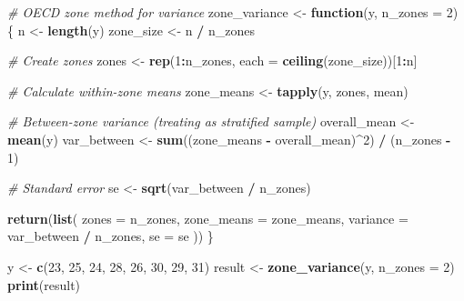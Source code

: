 \documentclass[
]{article}
\newenvironment{Shaded}{\begin{snugshade}}{\end{snugshade}}
\newcommand{\AttributeTok}[1]{\textcolor[rgb]{0.13,0.29,0.53}{#1}}
\newcommand{\CommentTok}[1]{\textcolor[rgb]{0.56,0.35,0.01}{\textit{#1}}}
\newcommand{\ControlFlowTok}[1]{\textcolor[rgb]{0.13,0.29,0.53}{\textbf{#1}}}
\newcommand{\DecValTok}[1]{\textcolor[rgb]{0.00,0.00,0.81}{#1}}
\newcommand{\FunctionTok}[1]{\textcolor[rgb]{0.13,0.29,0.53}{\textbf{#1}}}
\newcommand{\NormalTok}[1]{#1}
\newcommand{\OtherTok}[1]{\textcolor[rgb]{0.56,0.35,0.01}{#1}}
\newcommand{\SpecialCharTok}[1]{\textcolor[rgb]{0.81,0.36,0.00}{\textbf{#1}}}
\begin{document}
\begin{Shaded}
\begin{Highlighting}[]
\CommentTok{\# OECD zone method for variance}
\NormalTok{zone\_variance }\OtherTok{\textless{}{-}} \ControlFlowTok{function}\NormalTok{(y, }\AttributeTok{n\_zones =} \DecValTok{2}\NormalTok{) \{}
\NormalTok{  n }\OtherTok{\textless{}{-}} \FunctionTok{length}\NormalTok{(y)}
\NormalTok{  zone\_size }\OtherTok{\textless{}{-}}\NormalTok{ n }\SpecialCharTok{/}\NormalTok{ n\_zones}
  
  \CommentTok{\# Create zones}
\NormalTok{  zones }\OtherTok{\textless{}{-}} \FunctionTok{rep}\NormalTok{(}\DecValTok{1}\SpecialCharTok{:}\NormalTok{n\_zones, }\AttributeTok{each =} \FunctionTok{ceiling}\NormalTok{(zone\_size))[}\DecValTok{1}\SpecialCharTok{:}\NormalTok{n]}
  
  \CommentTok{\# Calculate within{-}zone means}
\NormalTok{  zone\_means }\OtherTok{\textless{}{-}} \FunctionTok{tapply}\NormalTok{(y, zones, mean)}
  
  \CommentTok{\# Between{-}zone variance (treating as stratified sample)}
\NormalTok{  overall\_mean }\OtherTok{\textless{}{-}} \FunctionTok{mean}\NormalTok{(y)}
\NormalTok{  var\_between }\OtherTok{\textless{}{-}} \FunctionTok{sum}\NormalTok{((zone\_means }\SpecialCharTok{{-}}\NormalTok{ overall\_mean)}\SpecialCharTok{\^{}}\DecValTok{2}\NormalTok{) }\SpecialCharTok{/}\NormalTok{ (n\_zones }\SpecialCharTok{{-}} \DecValTok{1}\NormalTok{)}
  
  \CommentTok{\# Standard error}
\NormalTok{  se }\OtherTok{\textless{}{-}} \FunctionTok{sqrt}\NormalTok{(var\_between }\SpecialCharTok{/}\NormalTok{ n\_zones)}
  
  \FunctionTok{return}\NormalTok{(}\FunctionTok{list}\NormalTok{(}
    \AttributeTok{zones =}\NormalTok{ n\_zones,}
    \AttributeTok{zone\_means =}\NormalTok{ zone\_means,}
    \AttributeTok{variance =}\NormalTok{ var\_between }\SpecialCharTok{/}\NormalTok{ n\_zones,}
    \AttributeTok{se =}\NormalTok{ se}
\NormalTok{  ))}
\NormalTok{\}}

\NormalTok{y }\OtherTok{\textless{}{-}} \FunctionTok{c}\NormalTok{(}\DecValTok{23}\NormalTok{, }\DecValTok{25}\NormalTok{, }\DecValTok{24}\NormalTok{, }\DecValTok{28}\NormalTok{, }\DecValTok{26}\NormalTok{, }\DecValTok{30}\NormalTok{, }\DecValTok{29}\NormalTok{, }\DecValTok{31}\NormalTok{)}
\NormalTok{result }\OtherTok{\textless{}{-}} \FunctionTok{zone\_variance}\NormalTok{(y, }\AttributeTok{n\_zones =} \DecValTok{2}\NormalTok{)}
\FunctionTok{print}\NormalTok{(result)}
\end{Highlighting}
\end{Shaded}
\end{document}
